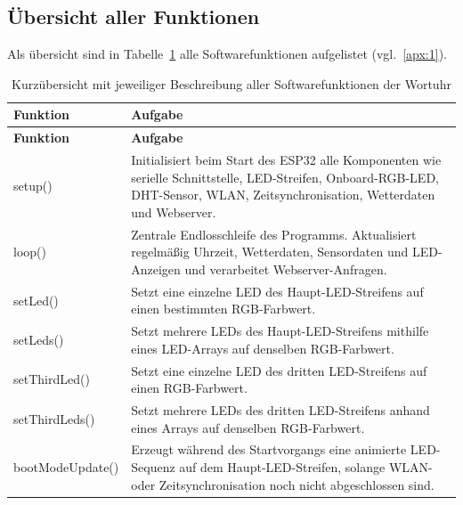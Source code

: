 \subsection{Übersicht aller Funktionen} 
Als übersicht sind in Tabelle~\ref{tab:funktionen_wordclock} alle Softwarefunktionen aufgelistet (vgl.~\ref{apx:1}).
\begin{longtable}{p{} p{}}
\caption{Kurzübersicht mit jeweiliger Beschreibung aller Softwarefunktionen der Wortuhr}
\label{tab:funktionen_wordclock} \\

\hline
\textbf{Funktion} & \textbf{Aufgabe} \\
\hline
\endfirsthead

\hline
\textbf{Funktion} & \textbf{Aufgabe} \\
\hline
\endhead

\hline
\endfoot

{\small\ttfamily setup()} &
Initialisiert beim Start des ESP32 alle Komponenten wie serielle Schnittstelle, LED-Streifen, Onboard-RGB-LED, DHT-Sensor, WLAN, Zeitsynchronisation, Wetterdaten und Webserver. \\

{\small\ttfamily loop()} &
Zentrale Endlosschleife des Programms. Aktualisiert regelmäßig Uhrzeit, Wetterdaten, Sensordaten und LED-Anzeigen und verarbeitet Webserver-Anfragen. \\

{\small\ttfamily setLed()} &
Setzt eine einzelne LED des Haupt-LED-Streifens auf einen bestimmten RGB-Farbwert. \\

{\small\ttfamily setLeds()} &
Setzt mehrere LEDs des Haupt-LED-Streifens mithilfe eines LED-Arrays auf denselben RGB-Farbwert. \\

{\small\ttfamily setThirdLed()} &
Setzt eine einzelne LED des dritten LED-Streifens auf einen RGB-Farbwert. \\

{\small\ttfamily setThirdLeds()} &
Setzt mehrere LEDs des dritten LED-Streifens anhand eines Arrays auf denselben RGB-Farbwert. \\

{\small\ttfamily bootModeUpdate()} &
Erzeugt während des Startvorgangs eine animierte LED-Sequenz auf dem Haupt-LED-Streifen, solange WLAN- oder Zeitsynchronisation noch nicht abgeschlossen sind. \\


\end{longtable}
